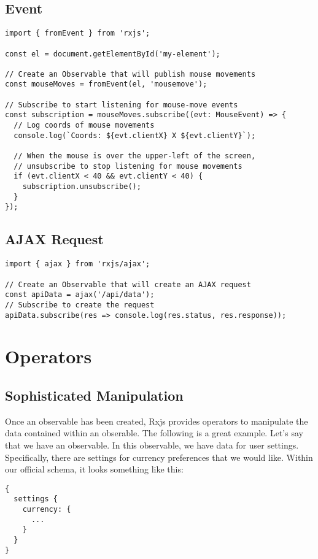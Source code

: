 \subsection{Event}

\begin{lstlisting}
import { fromEvent } from 'rxjs';

const el = document.getElementById('my-element');

// Create an Observable that will publish mouse movements
const mouseMoves = fromEvent(el, 'mousemove');

// Subscribe to start listening for mouse-move events
const subscription = mouseMoves.subscribe((evt: MouseEvent) => {
  // Log coords of mouse movements
  console.log(`Coords: ${evt.clientX} X ${evt.clientY}`);

  // When the mouse is over the upper-left of the screen,
  // unsubscribe to stop listening for mouse movements
  if (evt.clientX < 40 && evt.clientY < 40) {
    subscription.unsubscribe();
  }
});
\end{lstlisting}

\subsection{AJAX Request}
\begin{lstlisting}
import { ajax } from 'rxjs/ajax';

// Create an Observable that will create an AJAX request
const apiData = ajax('/api/data');
// Subscribe to create the request
apiData.subscribe(res => console.log(res.status, res.response));
\end{lstlisting}

\section{Operators}

\subsection{Sophisticated Manipulation}
Once an observable has been created, Rxjs provides operators to manipulate 
the data contained within an obserable. The following is a great example. Let's
say that we have an observable. In this observable, we have data for user 
settings. Specifically, there are settings for currency preferences that we 
would like. Within our official schema, it looks something like this: 
\begin{lstlisting}
{
  settings {
    currency: {
      ...
    }
  }
}  
\end{lstlisting}

